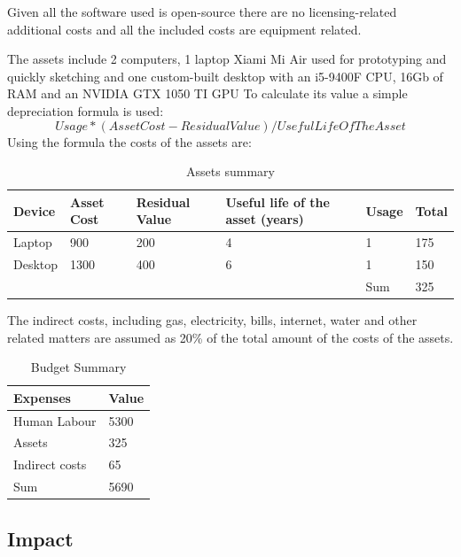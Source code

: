 Given all the software used is open-source there are no licensing-related additional costs and all the included costs are equipment related.

The assets include 2 computers, 1 laptop Xiami Mi Air used for prototyping and quickly sketching and one custom-built desktop with an i5-9400F CPU, 16Gb of RAM and an NVIDIA GTX 1050 TI GPU 
To calculate its value a simple depreciation formula is used:
$$Usage *  (Asset Cost - Residual Value) / Useful Life Of The Asset$$
Using the formula the costs of the assets are:
\begin{table}[h!]
    \centering
    \begin{tabular}{l l l l l l} 
        \hline
        Device & Asset Cost & Residual Value & Useful life of the asset (years) & Usage & Total \\ [0.5ex] 
        \hline
        Laptop & 900 & 200 &  4 & 1 & 175 \\ 
        Desktop & 1300 & 400 & 6 & 1 & 150 \\
        \hline
        & & & & Sum & 325 \\
        \hline
    \end{tabular}
    \caption{Assets summary}
    \label{table:2}
\end{table}

The indirect costs, including gas, electricity, bills, internet, water and other related matters are assumed as 20\% of the total amount of the costs of the assets.

\begin{table}[h!]
    \centering
    \begin{tabular}{l l} 
        \hline
        Expenses & Value \\
        \hline
        Human Labour & 5300 \\ 
        Assets & 325 \\
        Indirect costs & 65 \\
        \hline
        Sum & 5690 \\
        \hline
    \end{tabular}
    \caption{Budget Summary}
    \label{table:Budget Summary}
\end{table}
\newpage

\subsection{Impact}
\newpage

